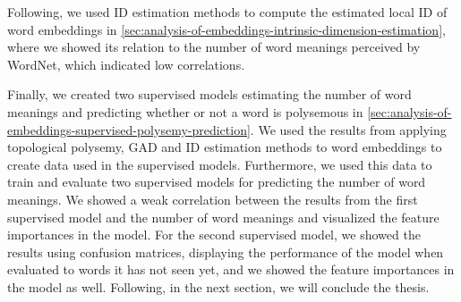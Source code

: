 Following, we used ID estimation methods to compute the estimated local ID of word embeddings in \cref{sec:analysis-of-embeddings-intrinsic-dimension-estimation}, where we showed its relation to the number of word meanings perceived by WordNet, which indicated low correlations.

Finally, we created two supervised models estimating the number of word meanings and predicting whether or not a word is polysemous in \cref{sec:analysis-of-embeddings-supervised-polysemy-prediction}. We used the results from applying topological polysemy, GAD and ID estimation methods to word embeddings to create data used in the supervised models. Furthermore, we used this data to train and evaluate two supervised models for predicting the number of word meanings. We showed a weak correlation between the results from the first supervised model and the number of word meanings and visualized the feature importances in the model. For the second supervised model, we showed the results using confusion matrices, displaying the performance of the model when evaluated to words it has not seen yet, and we showed the feature importances in the model as well. Following, in the next section, we will conclude the thesis.